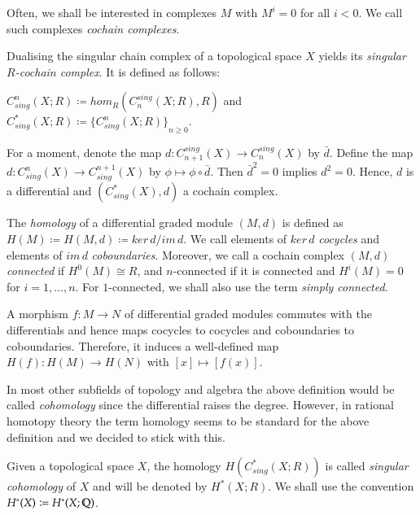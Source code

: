 Often, we shall be interested in complexes $M$ with $M^i = 0$ for all $i < 0$. We call such complexes \emph{cochain complexes}.

\begin{Example}
 Dualising the singular chain complex of a topological space $X$ yields its \emph{singular $R$-cochain complex}. It is 
 defined as follows: 
 
 $C^n_{sing}(X;R) \coloneqq hom_R(C_n^{sing}(X;R),R)$ and
 $C^*_{sing}(X;R) \coloneqq { \lbrace C^n_{sing}(X;R) \rbrace }_{n \geq 0}$. 
 
 For a moment, denote  the map $d \colon C_{n+1}^{sing}(X) \to C_n^{sing}(X)$ by $\bar{d}$. Define the map
 $d \colon C_{sing}^n(X) \to C_{sing}^{n+1}(X)$ by $\phi \mapsto \phi \circ \bar{d}$. Then ${\bar{d}}^2 = 0$ implies $d^2 = 0$.
 Hence, $d$ is a differential and $(C^*_{sing}(X),d)$ a cochain complex.
\end{Example}

\begin{Definition}
The \emph{homology} of a differential graded module $(M,d)$ is defined as $H(M) \coloneqq 
H(M,d) \coloneqq ker \, d / im \, d$.
We call elements of $ker \, d$ \emph{cocycles} and elements of $im \, d$ \emph{coboundaries}.
Moreover, we call a cochain complex $(M,d)$ \emph{connected} if $H^0(M) \cong R$, and $n$-connected if 
it is connected and $H^i(M) = 0$ for $i = 1, \dotsc, n$. For $1$-connected, we shall also use the term \emph{simply connected}.
\end{Definition}

A morphism $f \colon M \to N$ of differential graded modules commutes with the differentials and hence maps cocycles to cocycles
and coboundaries to coboundaries. Therefore, it induces a well-defined map $H(f) \colon H(M) \to H(N) $ with $[x] \mapsto [f(x)]$. 

\begin{Remark}
 In most other subfields of topology and algebra the above definition would be called \emph{cohomology} since the
 differential raises the degree. However, in rational homotopy theory the term homology seems to be standard for the
 above definition and we decided to stick with this.
\end{Remark}

\begin{Example}
 Given a topological space $X$, the homology $H(C^*_{sing}(X;R))$ is called \emph{singular cohomology} of $X$
 and will be denoted by $H^*(X;R)$. We shall use the convention $H^*(X) \coloneqq H^*(X; \mathbb{Q})$.	
\end{Example}


